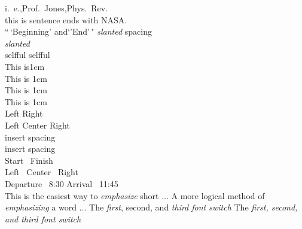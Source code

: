 \documentclass[12pt,twoside,a4paper]{article}   %
\begin{document}
	i.~e.,Prof.~Jones,Phys.\ Rev.\\ %
	this is sentence ends with NASA\@.\\ %
	\frenchspacing %
	\nonfrenchspacing  %
	``\,`Beginning' and`'End'\,"
	{\slshape slanted\/} spacing\\ %
 	\textsl{slanted}\\
 	self\/ful			selfful\\
 	This is\hspace{1cm}1cm\\	
 	This is \hspace{1cm}1cm\\
 	This is \hspace{1cm} 1cm\\
 	\hspace*{3em} This is 1cm\\ %
	\vspace{1cm}
 	Left \hfill Right\\ %
 	Left \hfill Center \hfill Right\\
	\quad insert spacing\\
	\qquad insert spacing\\
 	Start \dotfill\ Finish\\ %
 	Left \hrulefill\ Center \hrulefill\ Right\\ %
 	Departure \dotfill\dotfill\dotfill\ 8:30 \hfill\hfill Arrival \hrulefill\ 11:45\\
	\vfill	%
	This is the easiest way to {\em emphasize} short ...
	A more logical method of \emph{emphasizing} a word ...
	The {\em first}, second, and {\em third font switch}
	The {\em first, {\em second, and {\em third font switch}}}
\end{document}
